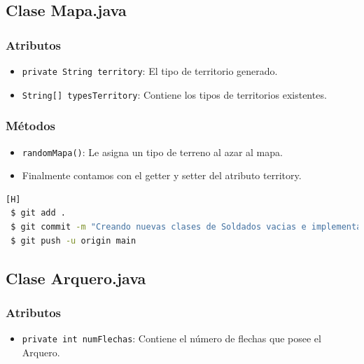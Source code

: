 \documentclass{article}
\begin{document}
\newpage %

\subsection{Clase Mapa.java}

\subsubsection{Atributos}
\begin{itemize}
    \item \texttt{private String territory}: El tipo de territorio generado.
    \item \texttt{String[] typesTerritory}: Contiene los tipos de territorios existentes.
\end{itemize}

\subsubsection{Métodos}
\begin{itemize}
    \item \texttt{randomMapa()}: Le asigna un tipo de terreno al azar al mapa.
    \item Finalmente contamos con el getter y setter del atributo territory.
\end{itemize}



\begin{lstlisting}[language=bash,caption={Commit \href{https://github.com/hernanchoquehuanca/fp2-23b/commit/e7c3920e3f29d3305071fa8bbfa41c7f231eed65}{e7c3920}: Primera version de la clase Mapa, ya que luego se fue adaptando según se realizaban cambios en el código}][H]
 $ git add .
 $ git commit -m "Creando nuevas clases de Soldados vacias e implementando la clase Mapa.java"			
 $ git push -u origin main
\end{lstlisting}

\newpage %

\subsection{Clase Arquero.java}
\subsubsection{Atributos}
\begin{itemize}
    \item \texttt{private int numFlechas}: Contiene el número de flechas que posee el Arquero.
\end{itemize}
\end{document}
